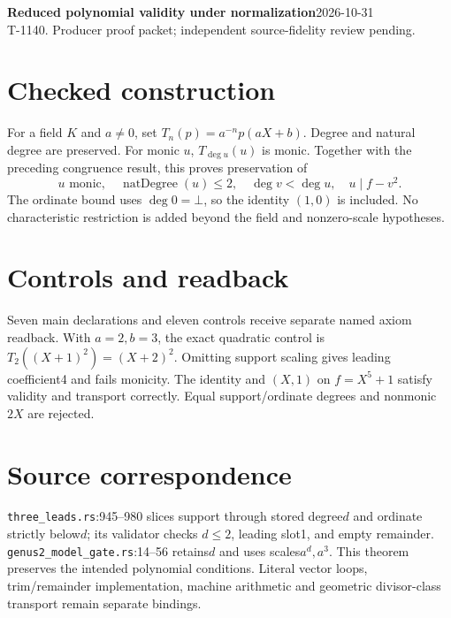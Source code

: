 \documentclass[10pt]{article}
\begin{document}
\textbf{Reduced polynomial validity under normalization}\hfill2026-10-31\\T-1140. Producer proof packet; independent source-fidelity review pending.
\section*{Checked construction}
For a field $K$ and $a\ne0$, set $T_n(p)=a^{-n}p(aX+b)$. Degree and natural degree are preserved. For monic $u$, $T_{\deg u}(u)$ is monic. Together with the preceding congruence result, this proves preservation of
\[u\text{ monic},\quad\operatorname{natDegree}(u)\le2,\quad\deg v<\deg u,\quad u\mid f-v^2.\]
The ordinate bound uses $\deg0=\bot$, so the identity $(1,0)$ is included. No characteristic restriction is added beyond the field and nonzero-scale hypotheses.
\begin{center}\end{center}
\section*{Controls and readback}
Seven main declarations and eleven controls receive separate named axiom readback. With $a=2,b=3$, the exact quadratic control is $T_2((X+1)^2)=(X+2)^2$. Omitting support scaling gives leading coefficient4 and fails monicity. The identity and $(X,1)$ on $f=X^5+1$ satisfy validity and transport correctly. Equal support/ordinate degrees and nonmonic $2X$ are rejected.
\section*{Source correspondence}
\texttt{three\_leads.rs}:945--980 slices support through stored degree$d$ and ordinate strictly below$d$; its validator checks $d\le2$, leading slot1, and empty remainder. \texttt{genus2\_model\_gate.rs}:14--56 retains$d$ and uses scales$a^d,a^3$. This theorem preserves the intended polynomial conditions. Literal vector loops, trim/remainder implementation, machine arithmetic and geometric divisor-class transport remain separate bindings.
\end{document}
